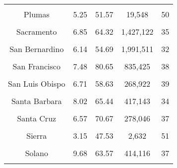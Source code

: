 \documentclass[
  ignorenonframetext,
]{beamer}
\begin{document}
\begin{frame}
\begin{table}
{\begin{tabular}[t]{ccccc}
\addlinespace
\cellcolor{gray!6}{Placer} & \cellcolor{gray!6}{6.24} & \cellcolor{gray!6}{65.71} & \cellcolor{gray!6}{367,860} & \cellcolor{gray!6}{40}\\
Plumas & 5.25 & 51.57 & 19,548 & 50\\
\cellcolor{gray!6}{Riverside} & \cellcolor{gray!6}{6.85} & \cellcolor{gray!6}{57.00} & \cellcolor{gray!6}{2,255,664} & \cellcolor{gray!6}{34}\\
Sacramento & 6.85 & 64.32 & 1,427,122 & 35\\
\cellcolor{gray!6}{San Benito} & \cellcolor{gray!6}{8.23} & \cellcolor{gray!6}{66.00} & \cellcolor{gray!6}{55,001} & \cellcolor{gray!6}{34}\\
\addlinespace
San Bernardino & 6.14 & 54.69 & 1,991,511 & 32\\
\cellcolor{gray!6}{San Diego} & \cellcolor{gray!6}{11.86} & \cellcolor{gray!6}{69.67} & \cellcolor{gray!6}{3,101,086} & \cellcolor{gray!6}{35}\\
San Francisco & 7.48 & 80.65 & 835,425 & 38\\
\cellcolor{gray!6}{San Joaquin} & \cellcolor{gray!6}{9.36} & \cellcolor{gray!6}{58.80} & \cellcolor{gray!6}{688,728} & \cellcolor{gray!6}{33}\\
San Luis Obispo & 6.71 & 58.63 & 268,922 & 39\\
\addlinespace
\cellcolor{gray!6}{San Mateo} & \cellcolor{gray!6}{8.05} & \cellcolor{gray!6}{79.03} & \cellcolor{gray!6}{696,222} & \cellcolor{gray!6}{39}\\
Santa Barbara & 8.02 & 65.44 & 417,143 & 34\\
\cellcolor{gray!6}{Santa Clara} & \cellcolor{gray!6}{7.22} & \cellcolor{gray!6}{80.93} & \cellcolor{gray!6}{1,833,854} & \cellcolor{gray!6}{36}\\
Santa Cruz & 6.57 & 70.67 & 278,046 & 37\\
\cellcolor{gray!6}{Shasta} & \cellcolor{gray!6}{6.23} & \cellcolor{gray!6}{44.58} & \cellcolor{gray!6}{161,537} & \cellcolor{gray!6}{42}\\
\addlinespace
Sierra & 3.15 & 47.53 & 2,632 & 51\\
\cellcolor{gray!6}{Siskiyou} & \cellcolor{gray!6}{6.24} & \cellcolor{gray!6}{45.39} & \cellcolor{gray!6}{40,245} & \cellcolor{gray!6}{47}\\
Solano & 9.68 & 63.57 & 414,116 & 37\\
\cellcolor{gray!6}{Sonoma} & \cellcolor{gray!6}{7.18} & \cellcolor{gray!6}{72.45} & \cellcolor{gray!6}{475,030} & \cellcolor{gray!6}{40}\\

\end{tabular}}
\end{table}
\end{frame}
\end{document}
